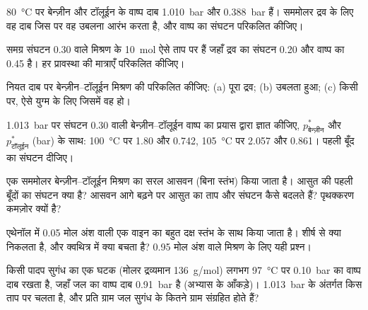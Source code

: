 \begin{exercise}[$\star$]\label{exo:b2:liquid-vapour-diagrams:2}
\qty{80}{\degreeCelsius} पर बेन्ज़ीन और टॉलूईन के वाष्प दाब
\qty{1.010}{bar} और \qty{0.388}{bar} हैं। सममोलर द्रव के लिए वह
दाब जिस पर वह उबलना आरंभ करता है, और वाष्प का संघटन परिकलित कीजिए।
\end{exercise}

\begin{exercise}[$\star$]\label{exo:b2:liquid-vapour-diagrams:3}
समग्र संघटन 0.30 वाले मिश्रण के \qty{10}{mol} ऐसे ताप पर हैं
जहाँ द्रव का संघटन 0.20 और वाष्प का 0.45 है। हर प्रावस्था की
मात्राएँ परिकलित कीजिए।
\end{exercise}

\begin{exercise}[$\star$]\label{exo:b2:liquid-vapour-diagrams:4}
नियत दाब पर बेन्ज़ीन--टॉलूईन मिश्रण की  परिकलित कीजिए: (a) पूरा द्रव; (b)
उबलता हुआ; (c) किसी  पर, ऐसे युग्म के लिए जिसमें वह हो।
\end{exercise}

\begin{exercise}[$\star\star$]\label{exo:b2:liquid-vapour-diagrams:5}
\qty{1.013}{bar} पर संघटन 0.30 वाली बेन्ज़ीन--टॉलूईन वाष्प का  प्रयास द्वारा ज्ञात
कीजिए, $p^*_{\text{बेन्ज़ीन}}$ और $p^*_{\text{टॉलूईन}}$
(\unit{bar}) के साथ: \qty{100}{\degreeCelsius} पर 1.80 और 0.742,
\qty{105}{\degreeCelsius} पर 2.057 और 0.861। पहली बूँद का संघटन दीजिए।
\end{exercise}

\begin{exercise}[$\star\star$]\label{exo:b2:liquid-vapour-diagrams:6}
एक सममोलर बेन्ज़ीन--टॉलूईन मिश्रण का सरल आसवन (बिना स्तंभ) किया जाता है। आसुत की
पहली बूँदों का संघटन क्या है? आसवन आगे बढ़ने पर आसुत का ताप और
संघटन कैसे बदलते हैं? पृथक्करण
कमज़ोर क्यों है?
\end{exercise}

\begin{exercise}[$\star\star$]\label{exo:b2:liquid-vapour-diagrams:7}
एथेनॉल में 0.05 मोल अंश वाली एक वाइन का बहुत दक्ष स्तंभ के साथ 
किया जाता है। शीर्ष से क्या निकलता है, और क्वथित्र में क्या बचता है?
0.95 मोल अंश वाले मिश्रण के लिए यही प्रश्न।
\end{exercise}

\begin{exercise}[$\star\star$]\label{exo:b2:liquid-vapour-diagrams:8}
किसी पादप सुगंध का एक घटक (मोलर द्रव्यमान \qty{136}{g/mol}) लगभग
\qty{97}{\degreeCelsius} पर \qty{0.10}{bar} का वाष्प दाब रखता है, जहाँ जल का वाष्प दाब
\qty{0.91}{bar} है (अभ्यास के आँकड़े)। \qty{1.013}{bar} के अंतर्गत  किस ताप पर चलता है, और प्रति ग्राम जल सुगंध के कितने ग्राम
संग्रहित होते हैं?
\end{exercise}

